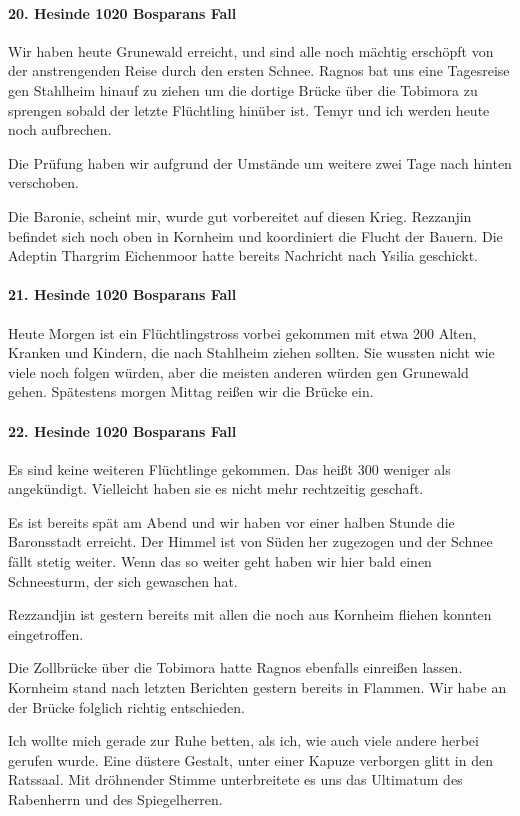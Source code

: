 \paragraph{20. Hesinde 1020 Bosparans Fall}
Wir haben heute Grunewald erreicht, und sind alle noch mächtig erschöpft von der anstrengenden Reise durch den ersten Schnee. Ragnos bat uns eine Tagesreise gen Stahlheim hinauf zu ziehen um die dortige Brücke über die Tobimora zu sprengen sobald der letzte Flüchtling hinüber ist. Temyr und ich werden heute noch aufbrechen.

Die Prüfung haben wir aufgrund der Umstände um weitere zwei Tage nach hinten verschoben.

Die Baronie, scheint mir, wurde gut vorbereitet auf diesen Krieg. Rezzanjin befindet sich noch oben in Kornheim und koordiniert die Flucht der Bauern. Die Adeptin Thargrim Eichenmoor hatte bereits Nachricht nach Ysilia geschickt.

\paragraph{21. Hesinde 1020 Bosparans Fall}
Heute Morgen ist ein Flüchtlingstross vorbei gekommen mit etwa 200 Alten, Kranken und Kindern, die nach Stahlheim ziehen sollten. Sie wussten nicht wie viele noch folgen würden, aber die meisten anderen würden gen Grunewald gehen.
Spätestens morgen Mittag reißen wir die Brücke ein.

\paragraph{22. Hesinde 1020 Bosparans Fall}
Es sind keine weiteren Flüchtlinge gekommen. Das heißt 300 weniger als angekündigt. Vielleicht haben sie es nicht mehr rechtzeitig geschaft.

Es ist bereits spät am Abend und wir haben vor einer halben Stunde die Baronsstadt erreicht. Der Himmel ist von Süden her zugezogen und der Schnee fällt stetig weiter. Wenn das so weiter geht haben wir hier bald einen Schneesturm, der sich gewaschen hat.

Rezzandjin ist gestern bereits mit allen die noch aus Kornheim fliehen konnten eingetroffen.

Die Zollbrücke über die Tobimora hatte Ragnos ebenfalls einreißen lassen. Kornheim stand nach letzten Berichten gestern bereits in Flammen. Wir habe an der Brücke folglich richtig entschieden.

Ich wollte mich gerade zur Ruhe betten, als ich, wie auch viele andere herbei gerufen wurde. Eine düstere Gestalt, unter einer Kapuze verborgen glitt in den Ratssaal. Mit dröhnender Stimme unterbreitete es uns das Ultimatum des Rabenherrn und des Spiegelherren.

